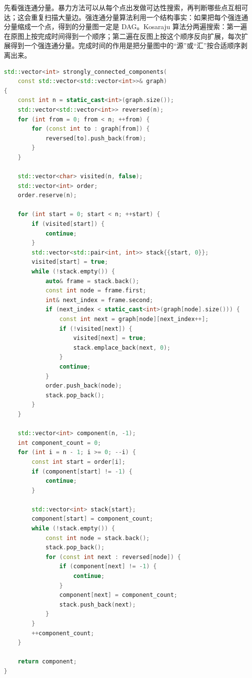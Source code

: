 先看强连通分量。暴力方法可以从每个点出发做可达性搜索，再判断哪些点互相可达；这会重复扫描大量边。强连通分量算法利用一个结构事实：如果把每个强连通分量缩成一个点，得到的分量图一定是 DAG。Kosaraju 算法分两遍搜索：第一遍在原图上按完成时间得到一个顺序；第二遍在反图上按这个顺序反向扩展，每次扩展得到一个强连通分量。完成时间的作用是把分量图中的“源”或“汇”按合适顺序剥离出来。

\begin{lstlisting}[language=C++,caption={Kosaraju：显式栈求有向图强连通分量}]
std::vector<int> strongly_connected_components(
    const std::vector<std::vector<int>>& graph)
{
    const int n = static_cast<int>(graph.size());
    std::vector<std::vector<int>> reversed(n);
    for (int from = 0; from < n; ++from) {
        for (const int to : graph[from]) {
            reversed[to].push_back(from);
        }
    }

    std::vector<char> visited(n, false);
    std::vector<int> order;
    order.reserve(n);

    for (int start = 0; start < n; ++start) {
        if (visited[start]) {
            continue;
        }
        std::vector<std::pair<int, int>> stack{{start, 0}};
        visited[start] = true;
        while (!stack.empty()) {
            auto& frame = stack.back();
            const int node = frame.first;
            int& next_index = frame.second;
            if (next_index < static_cast<int>(graph[node].size())) {
                const int next = graph[node][next_index++];
                if (!visited[next]) {
                    visited[next] = true;
                    stack.emplace_back(next, 0);
                }
                continue;
            }
            order.push_back(node);
            stack.pop_back();
        }
    }

    std::vector<int> component(n, -1);
    int component_count = 0;
    for (int i = n - 1; i >= 0; --i) {
        const int start = order[i];
        if (component[start] != -1) {
            continue;
        }

        std::vector<int> stack{start};
        component[start] = component_count;
        while (!stack.empty()) {
            const int node = stack.back();
            stack.pop_back();
            for (const int next : reversed[node]) {
                if (component[next] != -1) {
                    continue;
                }
                component[next] = component_count;
                stack.push_back(next);
            }
        }
        ++component_count;
    }

    return component;
}
\end{lstlisting}

